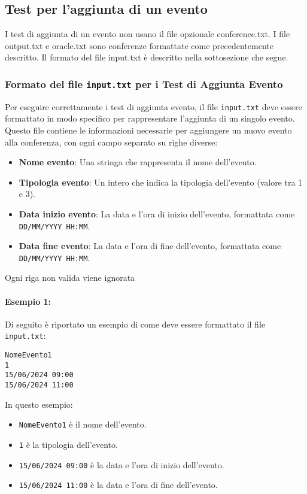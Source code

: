\documentclass[11pt]{scrartcl} %
\begin{document}
\subsection{Test per l'aggiunta di un evento}
I test di aggiunta di un evento non usano il file opzionale conference.txt. I file output.txt e oracle.txt sono conferenze formattate come precedentemente descritto. Il formato del file input.txt è descritto nella sottosezione che segue.

\subsubsection{Formato del file \texttt{input.txt} per i Test di Aggiunta Evento}

Per eseguire correttamente i test di aggiunta evento, il file \texttt{input.txt} deve essere formattato in modo specifico per rappresentare l'aggiunta di un singolo evento. Questo file contiene le informazioni necessarie per aggiungere un nuovo evento alla conferenza, con ogni campo separato su righe diverse:

\begin{itemize}
    \item \textbf{Nome evento}: Una stringa che rappresenta il nome dell'evento.
    \item \textbf{Tipologia evento}: Un intero che indica la tipologia dell'evento (valore tra 1 e 3).
    \item \textbf{Data inizio evento}: La data e l'ora di inizio dell'evento, formattata come \texttt{DD/MM/YYYY HH:MM}.
    \item \textbf{Data fine evento}: La data e l'ora di fine dell'evento, formattata come \texttt{DD/MM/YYYY HH:MM}.
\end{itemize}

Ogni riga non valida viene ignorata

\paragraph{Esempio 1:}
Di seguito è riportato un esempio di come deve essere formattato il file \texttt{input.txt}:

\begin{lstlisting}
NomeEvento1
1
15/06/2024 09:00
15/06/2024 11:00
\end{lstlisting}

In questo esempio:
\begin{itemize}
    \item \texttt{NomeEvento1} è il nome dell'evento.
    \item \texttt{1} è la tipologia dell'evento.
    \item \texttt{15/06/2024 09:00} è la data e l'ora di inizio dell'evento.
    \item \texttt{15/06/2024 11:00} è la data e l'ora di fine dell'evento.
\end{itemize}
\end{document}
